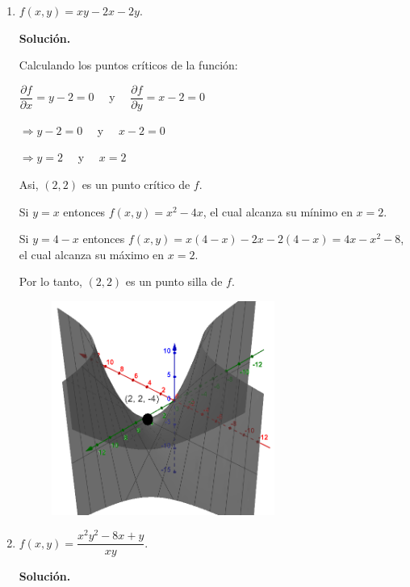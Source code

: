 \documentclass[fleqn, 12pt]{article}
\newcommand{\derivadaparcial}[2]{\dfrac{\partial {#1}}{\partial {#2}}}
\begin{document}
\begin{enumerate}
\begin{enumerate}
            \item $ f(x,y) = xy - 2x - 2y $.
            
            \textbf{Solución.}

            Calculando los puntos críticos de la función:

            $ \derivadaparcial{f}{x} = y - 2 = 0 \quad $ y $ \quad \derivadaparcial{f}{y} = x - 2 = 0 $

            $ \Longrightarrow y - 2 = 0 \quad $ y $ \quad x - 2 = 0 $

            $ \Longrightarrow y = 2 \quad $ y $ \quad x = 2 $

            Asi, $ (2,2) $ es un punto crítico de $ f $.

            Si $ y = x $ entonces $ f(x,y) = x^2 - 4x $, el cual alcanza su mínimo en $ x = 2 $.

            Si $ y = 4 - x $ entonces $ f(x,y) = x(4-x) - 2x - 2(4-x) = 4x - x^2 - 8 $, el cual alcanza su máximo en $ x = 2 $.

            Por lo tanto, $ (2,2) $ es un punto silla de $ f $.

            \begin{figure}[h]
                \centering
                \includegraphics[height = 7cm]{Segundo.png}
            \end{figure}

            \item $ f(x,y) = \dfrac{x^2 y^2 - 8x + y}{xy} $.
            
            \textbf{Solución.}


\end{enumerate}
\end{enumerate}
\end{document}
